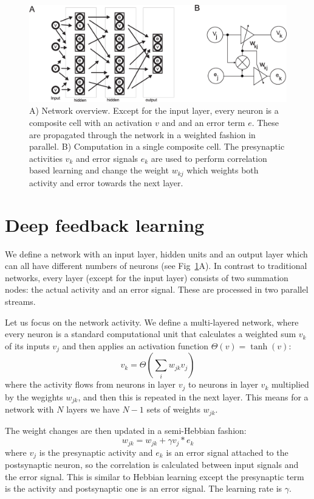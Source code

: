 \documentclass{llncs}
\begin{document}
\begin{figure}[h!]
  \centering
  \includegraphics[width=\columnwidth]{netw_together}
  \caption{A) Network overview. Except for the input layer,
    every neuron is a composite cell with an activation $v$ and
    and an error term $e$. These are propagated through the network
    in a weighted fashion in parallel.
B) Computation in a single composite cell.
    The presynaptic activities $v_k$ and error signals $e_k$ are used
    to perform correlation based learning and change the weight $w_{kj}$
    which weights both activity and error towards the next
    layer.\label{netw_together}}
\end{figure}


\section{Deep feedback learning}
We define a network with an input layer, hidden units and an output
layer which can all have different numbers of neurons (see
Fig~\ref{netw_together}A). In contrast to traditional
networks, every layer (except for the input layer) consists of two
summation nodes: the actual activity and an error signal. These
are processed in two parallel streams.

Let us focus on the network activity. We
define a multi-layered network, where every neuron is a standard
computational unit that calculates a weighted sum $v_k$ of its inputs $v_j$ and
then applies an activation function $\Theta(v) = \tanh(v)$:
\begin{equation}
  v_k = \Theta\left( \sum_i w_{jk} v_{j} \right) \label{act_sum}
\end{equation}
where the activity flows from neurons in layer $v_j$ to neurons in
layer $v_k$ multiplied by the wegights $w_{jk}$, and then this
is repeated in the next layer. This means for a network with
$N$ layers we have $N-1$ sets of weights $w_{jk}$.

The weight changes are then updated in a semi-Hebbian fashion:
\begin{equation}
  w_{jk} = w_{jk} + \gamma v_j * e_k \label{learningRule}
\end{equation}
where $v_j$ is the presynaptic activity and $e_k$ is an error signal
attached to the postsynaptic neuron, so the correlation is
calculated between input signals and the error signal.  This is
similar to Hebbian learning except the presynaptic term is the
activity and postsynaptic one is an error signal. The learning rate is $\gamma$.
\end{document}
